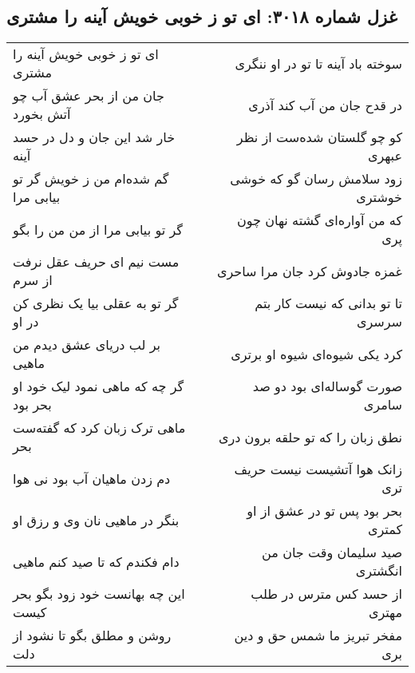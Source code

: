 \begin{center}
\section*{غزل شماره ۳۰۱۸: ای تو ز خوبی خویش آینه را مشتری}
\label{sec:3018}
\begin{longtable}{l p{0.5cm} r}
ای تو ز خوبی خویش آینه را مشتری
&&
سوخته باد آینه تا تو در او ننگری
\\
جان من از بحر عشق آب چو آتش بخورد
&&
در قدح جان من آب کند آذری
\\
خار شد این جان و دل در حسد آینه
&&
کو چو گلستان شده‌ست از نظر عبهری
\\
گم شده‌ام من ز خویش گر تو بیابی مرا
&&
زود سلامش رسان گو که خوشی خوشتری
\\
گر تو بیابی مرا از من من را بگو
&&
که من آواره‌ای گشته نهان چون پری
\\
مست نیم ای حریف عقل نرفت از سرم
&&
غمزه جادوش کرد جان مرا ساحری
\\
گر تو به عقلی بیا یک نظری کن در او
&&
تا تو بدانی که نیست کار بتم سرسری
\\
بر لب دریای عشق دیدم من ماهیی
&&
کرد یکی شیوه‌ای شیوه او برتری
\\
گر چه که ماهی نمود لیک خود او بحر بود
&&
صورت گوساله‌ای بود دو صد سامری
\\
ماهی ترک زبان کرد که گفته‌ست بحر
&&
نطق زبان را که تو حلقه برون دری
\\
دم زدن ماهیان آب بود نی هوا
&&
زانک هوا آتشیست نیست حریف تری
\\
بنگر در ماهیی نان وی و رزق او
&&
بحر بود پس تو در عشق از او کمتری
\\
دام فکندم که تا صید کنم ماهیی
&&
صید سلیمان وقت جان من انگشتری
\\
این چه بهانست خود زود بگو بحر کیست
&&
از حسد کس مترس در طلب مهتری
\\
روشن و مطلق بگو تا نشود از دلت
&&
مفخر تبریز ما شمس حق و دین بری
\\
\end{longtable}
\end{center}
